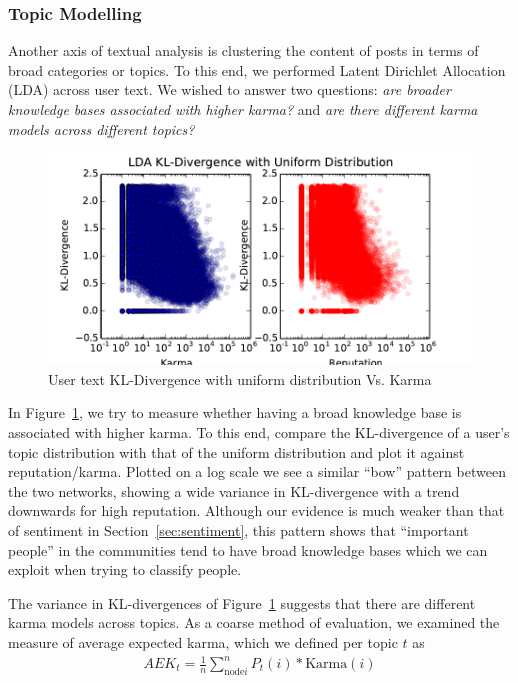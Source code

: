 \documentclass[11pt]{article}
\begin{document}
\subsubsection{Topic Modelling}
Another axis of textual analysis is clustering the content of posts in terms of
broad categories or topics. To this end, we performed Latent Dirichlet
Allocation (LDA) \cite{blei2003latent} across user text. We wished to answer two
questions: \textit{are broader knowledge bases associated with higher karma?} and
\textit{are there different karma models across different topics?}

\begin{figure}[h]
\centering
\includegraphics[width=\linewidth]{lda_kl}
\caption{User text KL-Divergence with uniform distribution Vs. Karma}
\label{fig:lda_kl}
\end{figure}

In Figure~\ref{fig:lda_kl}, we try to measure whether having a broad knowledge
base is associated with higher karma. To this end, compare the KL-divergence of
a user's topic distribution with that of the uniform distribution and plot it
against reputation/karma. Plotted on a log scale we see a similar ``bow''
pattern between the two networks, showing a wide variance in KL-divergence 
with a trend downwards for high reputation. Although our evidence is much weaker
than that of sentiment in Section~\ref{sec:sentiment}, this pattern shows that
``important people'' in the communities tend to have broad knowledge bases which
we can exploit when trying to classify people.

The variance in KL-divergences of Figure~\ref{fig:lda_kl} suggests that there
are different karma models across topics. As a coarse method of evaluation, 
we examined the measure of average expected karma, which we defined per topic 
$t$ as
\begin{align*}
AEK_t = \frac{1}{n} \sum_{\text{node} i}^n P_t(i) * \text{Karma}(i)
\end{align*}
\end{document}
